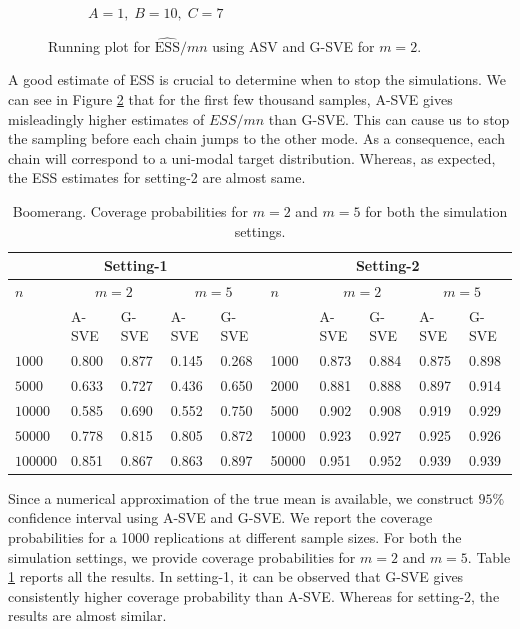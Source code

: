 \documentclass[11pt]{article}
\theoremstyle{remark}
\begin{document}
\begin{figure}[htbp]
\begin{subfigure}[h]{.4\textwidth}
      \caption{$A = 1, \; B=10, \; C = 7 $}
      \label{subfig:boom-ess2}
    \end{subfigure}
    \caption{Running plot for $\hat{\text{ESS}}/mn$ using ASV and G-SVE  for $m = 2$.}
    \label{fig:boom-ess}
\end{figure}


A good estimate of ESS is crucial to determine when to stop the simulations. We can see in Figure \ref{fig:boom-ess} that for the first few thousand samples, A-SVE gives misleadingly higher estimates of $ESS/mn$ than G-SVE. This can cause us to stop the sampling before each chain jumps to the other mode. As a consequence, each chain will correspond to a uni-modal target distribution. Whereas, as expected, the ESS estimates for setting-2 are almost same.\\


\begin{table}[htbp]
\centering
    \begin{tabular}{|l|l|l|l|l|l|l|l|l|l|}
    \hline
         \multicolumn{5}{|c|}{Setting-1} & \multicolumn{5}{|c|}{Setting-2}\\
        \hline
        $n$ & \multicolumn{2}{|c|}{$m = 2$} & \multicolumn{2}{|c|}{$m=5$} & $n$ & \multicolumn{2}{|c|}{$m = 2$} & \multicolumn{2}{|c|}{$m=5$}\\
        \hline
        & A-SVE & G-SVE & A-SVE & G-SVE & & A-SVE & G-SVE & A-SVE & G-SVE\\
        \hline
        $1000$ & 0.800 & 0.877 & 0.145 & 0.268 & 1000 & 0.873 & 0.884 & 0.875 & 0.898  \\
        $5000$ & 0.633 &  0.727 & 0.436 & 0.650 & 2000 & 0.881 & 0.888 & 0.897 & 0.914    \\
        $10000$  & 0.585 & 0.690 &  0.552 & 0.750 & 5000 & 0.902 & 0.908 & 0.919 & 0.929\\
        $50000$  & 0.778 & 0.815 & 0.805 & 0.872 & 10000 & 0.923 & 0.927 & 0.925 & 0.926\\
        $100000$ & 0.851 & 0.867 & 0.863 & 0.897 & 50000 & 0.951 & 0.952 & 0.939 & 0.939\\ \hline
    \end{tabular}
    \caption{Boomerang. Coverage probabilities for $m=2$ and $m=5$ for both the simulation settings. }
    \label{table:boom-coverage}
\end{table}


Since a numerical approximation of the true mean is available, we construct $95\%$ confidence interval using A-SVE and G-SVE. We report the coverage probabilities for a 1000 replications at different sample sizes. For both the simulation settings, we provide coverage probabilities for $m=2$ and $m=5$. Table \ref{table:boom-coverage} reports all the results. In setting-1, it can be observed that G-SVE gives consistently higher coverage probability than A-SVE. Whereas for setting-2, the results are almost similar.
\end{document}
